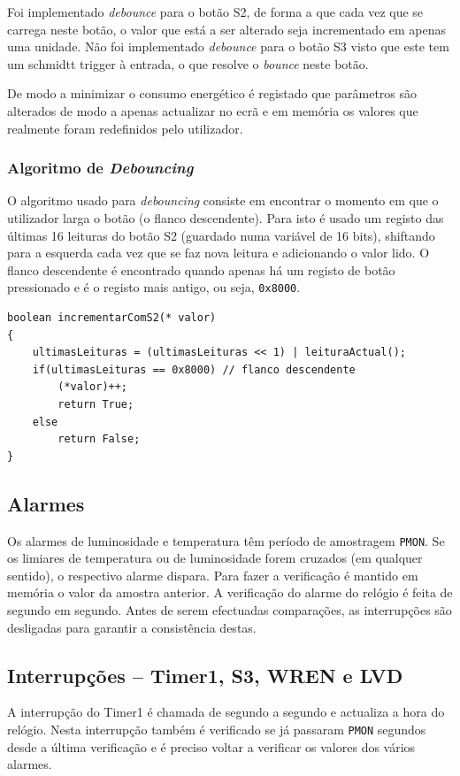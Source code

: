 \documentclass[a4paper,12pt]{article}
\begin{document}
Foi implementado \textit{debounce} para o botão S2, de forma a que cada vez que se carrega neste botão, o valor que está a ser alterado seja incrementado em apenas uma unidade. Não foi implementado \textit{debounce} para o botão S3 visto que este tem um schmidtt trigger à entrada, o que resolve o \textit{bounce} neste botão.

De modo a minimizar o consumo energético é registado que parâmetros são alterados de modo a apenas actualizar no ecrã e em memória os valores que realmente foram redefinidos pelo utilizador.

\subsubsection{Algoritmo de \textit{Debouncing}}
O algoritmo usado para \textit{debouncing} consiste em encontrar o momento em que o utilizador larga o botão (o flanco descendente). Para isto é usado um registo das últimas 16 leituras do botão S2 (guardado numa variável de 16 bits), shiftando para a esquerda cada vez que se faz nova leitura e adicionando o valor lido. O flanco descendente é encontrado quando apenas há um registo de botão pressionado e é o registo mais antigo, ou seja, \texttt{0x8000}.
\begin{lstlisting}
boolean incrementarComS2(* valor)
{
	ultimasLeituras = (ultimasLeituras << 1) | leituraActual();
	if(ultimasLeituras == 0x8000) // flanco descendente
		(*valor)++;
		return True;
	else
		return False;
}
\end{lstlisting}

\subsection{Alarmes}

Os alarmes de luminosidade e temperatura têm período de amostragem \texttt{PMON}. Se os limiares de temperatura ou de luminosidade forem cruzados (em qualquer sentido), o respectivo alarme dispara. Para fazer a verificação é mantido em memória o valor da amostra anterior.
A verificação do alarme do relógio é feita de segundo em segundo. Antes de serem efectuadas comparações, as interrupções são desligadas para garantir a consistência destas.

\subsection{Interrupções -- Timer1, S3, WREN e LVD}

A interrupção do Timer1 é chamada de segundo a segundo e actualiza a hora do relógio. Nesta interrupção também é verificado se já passaram \texttt{PMON} segundos desde a última verificação e é preciso voltar a verificar os valores dos vários alarmes.
\end{document}
